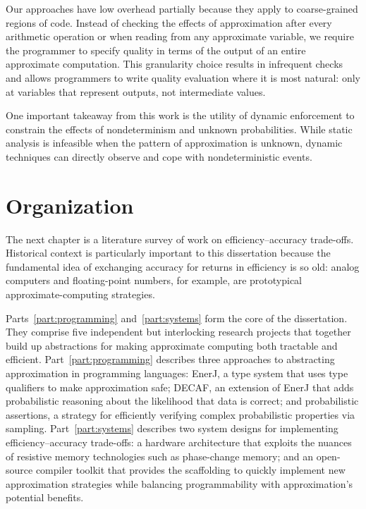 Our approaches have low overhead partially because they apply to
coarse-grained regions of code. Instead of checking the effects of
approximation after every arithmetic operation or when reading from any
approximate variable, we require the programmer to specify quality in terms of
the output of an entire approximate computation. This granularity choice
results in infrequent checks and allows programmers to write quality
evaluation where it is most natural: only at variables that represent outputs, not intermediate
values.

One important takeaway from this work is the utility of dynamic enforcement
to constrain the effects of nondeterminism and unknown probabilities. While
static analysis is infeasible when the pattern of approximation is unknown,
dynamic techniques can directly observe and cope with nondeterministic events.




\section{Organization}

The next chapter is a literature survey of work on efficiency--accuracy
trade-offs.
Historical context is particularly important to this dissertation because the
fundamental idea of exchanging accuracy for returns in efficiency is so old:
analog computers and floating-point numbers, for example, are prototypical
approximate-computing strategies.

Parts~\ref{part:programming} and~\ref{part:systems} form the core of the
dissertation.
They comprise five independent but interlocking research projects that
together build up abstractions for making approximate computing both tractable
and efficient.
%
Part~\ref{part:programming} describes three approaches to abstracting
approximation in programming languages:
EnerJ, a type system that uses type qualifiers to make approximation safe;
DECAF, an extension of EnerJ that adds probabilistic reasoning
about the likelihood that data is correct;
and probabilistic assertions, a strategy for efficiently verifying complex
probabilistic properties via sampling.
%
Part~\ref{part:systems} describes two system designs for implementing
efficiency--accuracy trade-offs:
a hardware architecture that exploits the nuances of resistive memory
technologies such as phase-change memory;
and an open-source compiler toolkit that provides the scaffolding to quickly
implement new approximation strategies while balancing programmability with
approximation's potential benefits.

